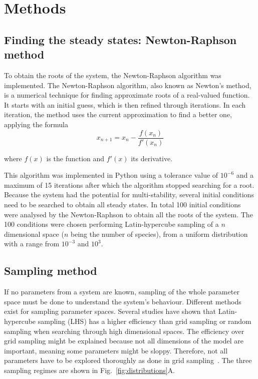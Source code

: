\chapter{Methods}
\section{Finding the steady states: Newton-Raphson method}\label{newton_raphson}

To obtain the roots of the system, the Newton-Raphson algorithm was implemented.
The Newton-Raphson algorithm, also known as Newton's method, is a numerical technique for finding approximate roots of a real-valued function. It starts with an initial guess, which is then refined through iterations. In each iteration, the method uses the current approximation to find a better one, applying the formula
\begin{equation}
x_{n+1} = x_{n} - \frac{f(x_{n})}{f'(x_{n})}
\end{equation}

where $f(x)$ is the function and $f'(x)$ its derivative.

This algorithm was implemented in Python using a tolerance value of $10^{-6}$ and a maximum of 15 iterations after which the algorithm stopped searching for a root.
Because the system had the potential for multi-stability, several initial conditions need to be searched to obtain all steady states.
In total 100 initial conditions were analysed by the Newton-Raphson to obtain all the roots of the system.
The 100 conditions were chosen performing Latin-hypercube sampling of a $n$ dimensional space ($n$ being the number of species), from a uniform distribution with a range from $10^{-3}$ and $10^3$.
\section{Sampling method}\label{sampling method}
If no parameters from a system are known, sampling of the whole parameter space must be done to understand the system's behaviour.
Different methods exist for sampling parameter spaces.
Several studies have shown that Latin-hypercube sampling (LHS) has a higher efficiency than grid sampling or random sampling when searching through high dimensional spaces.
The efficiency over grid sampling might be explained because not all dimensions of the model are important, meaning some parameters might be sloppy.
Therefore, not all parameters have to be explored thoroughly as done in grid sampling~\parencite{Iman2014, Bergstra2012}.
The three sampling regimes are shown in Fig.~\ref{fig:distributions}A.

